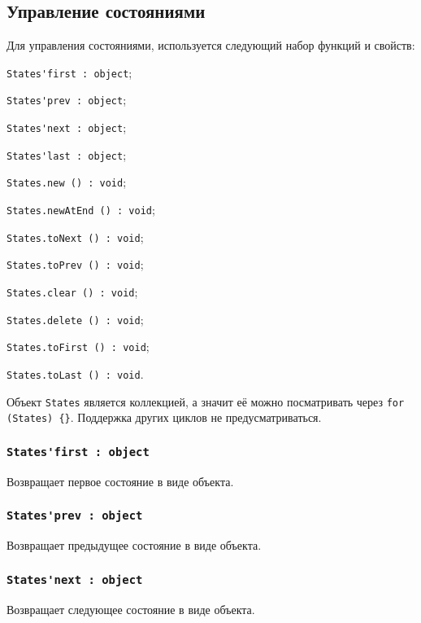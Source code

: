 \subsection{Управление состояниями}

Для управления состояниями, используется следующий набор функций и свойств:
\begin{icItems}
	\item \lstinline|States'first : object|;
	\item \lstinline|States'prev : object|;
	\item \lstinline|States'next : object|;
	\item \lstinline|States'last : object|;
	\item \lstinline|States.new () : void|;
	\item \lstinline|States.newAtEnd () : void|;
	\item \lstinline|States.toNext () : void|;
	\item \lstinline|States.toPrev () : void|;
	\item \lstinline|States.clear () : void|;
	\item \lstinline|States.delete () : void|;
	\item \lstinline|States.toFirst () : void|;
	\item \lstinline|States.toLast () : void|.
\end{icItems}

Объект \lstinline|States| является коллекцией, а значит её можно посматривать через \lstinline|for (States) {}|. Поддержка других циклов не предусматриваться.

\subsubsection{\lstinline|States'first : object|}

Возвращает первое состояние в виде объекта.

\subsubsection{\lstinline|States'prev : object|}

Возвращает предыдущее состояние в виде объекта.

\subsubsection{\lstinline|States'next : object|}

Возвращает следующее состояние в виде объекта.

